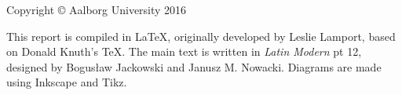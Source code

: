 \small
\strut\vfill %
\noindent Copyright \copyright{} Aalborg University 2016\par
\vspace{0.2cm}

\noindent This report is compiled in \LaTeX, originally developed by Leslie Lamport, based on Donald Knuth's \TeX. The main text is written in \emph{Latin Modern} pt 12, designed by Bogusław Jackowski and Janusz M. Nowacki. 
Diagrams are made using Inkscape and Tikz.%
\clearpage